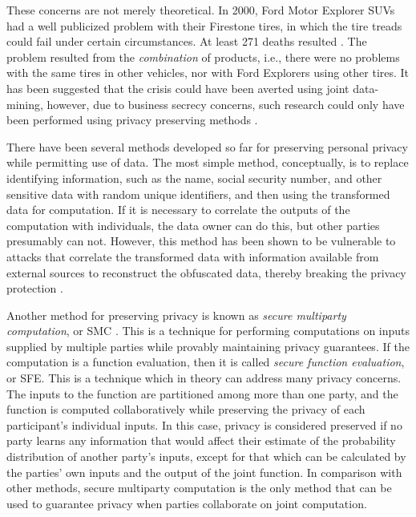 These concerns are not merely theoretical. In 2000, Ford Motor Explorer
SUVs had a well publicized problem with their Firestone tires, in
which the tire treads could fail under certain circumstances. At least
271 deaths resulted \cite{NYTFordFirestone}. The problem resulted
from the \emph{combination} of products, i.e., there were no problems with
the same tires in other vehicles, nor with Ford Explorers using other
tires. It has been suggested that the crisis could have been averted
using joint data-mining, however, due to business secrecy concerns,
such research could only have been performed using privacy preserving methods
\cite{VaidyaClifton:2002}.

There have been several methods developed so far for preserving personal
privacy while permitting use of data. The most simple method, conceptually,
is to replace identifying information, such as the name, social security
number, and other sensitive data with random unique identifiers, and
then using the transformed data for computation. If it is necessary
to correlate the outputs of the computation with individuals, the
data owner can do this, but other parties presumably can not. However,
this method has been shown to be vulnerable to attacks that correlate
the transformed data with information available from external sources
to reconstruct the obfuscated data, thereby breaking the privacy protection
\cite{Malin04}. 

Another method for preserving privacy is known as \emph{secure multiparty
computation}, or SMC \cite{Yao86}. This is a technique for performing computations on inputs
supplied by multiple parties while provably maintaining privacy guarantees.
If the computation is a function evaluation, then it is called \emph{secure
function evaluation}, or SFE. This is a technique which in theory can address
many privacy concerns. The inputs to
the function are partitioned among more than one party, and the function
is computed collaboratively while preserving the privacy of each participant's
individual inputs. In this case, privacy is considered preserved if
no party learns any information that would affect their estimate of
the probability distribution of another party's inputs, except for
that which can be calculated by the parties' own inputs and the output
of the joint function. In comparison with other methods, secure
multiparty computation is the only method that can be used to guarantee privacy when parties
collaborate on joint computation. %
\begin{comment}
%
\begin{lyxgreyedout}
Needs clarification
\end{lyxgreyedout}
 In other words, the entropy gain of each party is equivalent to the
entropy gain in an idealized protocol where a trusted third party
collects all the inputs, evaluates the function, and transmits only
the output to each party. Depending on the protocol, the guarantees
for some parties may be based on typical assumptions of computational
hardness, while the guarantees for other parties may be information
theoretic.
\end{comment}
{}

